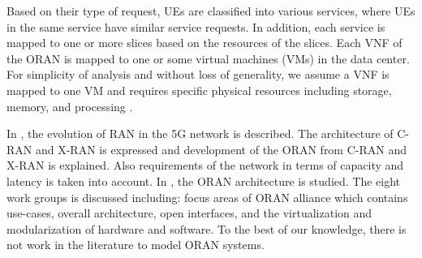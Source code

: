 \documentclass[conference]{IEEEtran}
\begin{document}
Based on their type of request, UEs are classified into various services, where UEs in the same service have similar service requests. In addition, each service is mapped to one or more slices based on the resources of the slices. Each VNF of the ORAN is mapped to one or some virtual machines (VMs) in the data center. For simplicity of analysis and without loss of generality, we assume a VNF is mapped to one VM and requires specific physical resources including storage, memory, and processing \cite{frdl,luong2018novel,luong2018novel1}.


In \cite{oranT},  the evolution of RAN in the  5G network is described. The architecture of C-RAN and X-RAN is expressed and development of the ORAN from C-RAN and X-RAN is explained. Also requirements of the network in terms of capacity and latency is taken into account.
In \cite{oran12},  the ORAN architecture is studied. The eight work groups is discussed including: focus areas of ORAN alliance which contains use-cases, overall architecture,  open interfaces, and  the virtualization and modularization of hardware and software. To the best of our knowledge, there is not work in the literature to model ORAN systems. 

\end{document}
